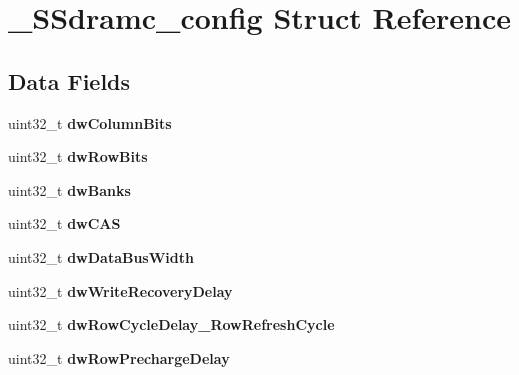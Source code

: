 \hypertarget{struct__SSdramc__config}{}\section{\+\_\+\+S\+Sdramc\+\_\+config Struct Reference}
\label{struct__SSdramc__config}
\subsection*{Data Fields}
\begin{DoxyCompactItemize}
\item 
\mbox{\label{struct__SSdramc__config_a90ba641ece848d6945a9c2cff54efdbc}} 
uint32\+\_\+t {\bfseries dw\+Column\+Bits}
\item 
\mbox{\label{struct__SSdramc__config_a5dfc8b272ad1848797ce0faa60fac62f}} 
uint32\+\_\+t {\bfseries dw\+Row\+Bits}
\item 
\mbox{\label{struct__SSdramc__config_a63ed266a5109fafb2a74866b88df3c91}} 
uint32\+\_\+t {\bfseries dw\+Banks}
\item 
\mbox{\label{struct__SSdramc__config_a413f07a500783bb90ce950aa3000bdd2}} 
uint32\+\_\+t {\bfseries dw\+C\+AS}
\item 
\mbox{\label{struct__SSdramc__config_a53e8add25e49a51dd53051ecbd59ca5e}} 
uint32\+\_\+t {\bfseries dw\+Data\+Bus\+Width}
\item 
\mbox{\label{struct__SSdramc__config_a1287c0ad5c91797120a9bb9557b77b5a}} 
uint32\+\_\+t {\bfseries dw\+Write\+Recovery\+Delay}
\item 
\mbox{\label{struct__SSdramc__config_ac806d39d017a8402b0f43b6f4806d6ac}} 
uint32\+\_\+t {\bfseries dw\+Row\+Cycle\+Delay\+\_\+\+Row\+Refresh\+Cycle}
\item 
\mbox{\label{struct__SSdramc__config_aae14ec0b188d148f200956fa30baf03f}} 
uint32\+\_\+t {\bfseries dw\+Row\+Precharge\+Delay}
\item 
\mbox{\label{struct__SSdramc__config_a7f0482ec4e35a02811dda4d30445e591}} 

\end{DoxyCompactItemize}

